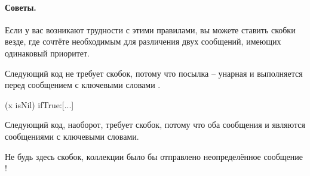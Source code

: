 \documentclass[a4paper,10pt,twoside]{book}
\begin{document}

\paragraph{Советы.} Если у вас возникают трудности с этими правилами, вы можете ставить скобки везде, где сочтёте необходимым для различения двух сообщений, имеющих одинаковый приоритет.

Следующий код не требует скобок, потому что посылка  -- унарная и выполняется перед сообщением с ключевыми словами .
\begin{code}{}
(x isNil)
   ifTrue:[...]
\end{code}

Следующий код, наоборот, требует скобок, потому что оба сообщения  и  являются сообщениями с ключевыми словами.
\noindent
Не будь здесь скобок, коллекции было бы отправлено неопределённое сообщение !

\end{document}
